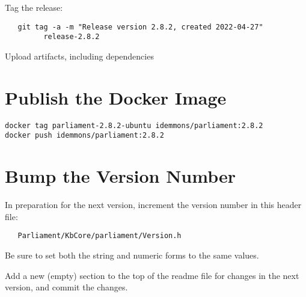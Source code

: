 \documentclass[12pt,letterpaper,draft]{article}
\begin{document}
Tag the release:

\begin{verbatim}
   git tag -a -m "Release version 2.8.2, created 2022-04-27"
         release-2.8.2
\end{verbatim}

Upload artifacts, including dependencies



\section{Publish the Docker Image}

\begin{verbatim}
docker tag parliament-2.8.2-ubuntu idemmons/parliament:2.8.2
docker push idemmons/parliament:2.8.2
\end{verbatim}



\section{Bump the Version Number}

In preparation for the next version, increment the version number in this header file:
\begin{verbatim}
   Parliament/KbCore/parliament/Version.h
\end{verbatim}
Be sure to set both the string and numeric forms to the same values.

Add a new (empty) section to the top of the readme file for changes in the next version, and commit the changes.
\end{document}
